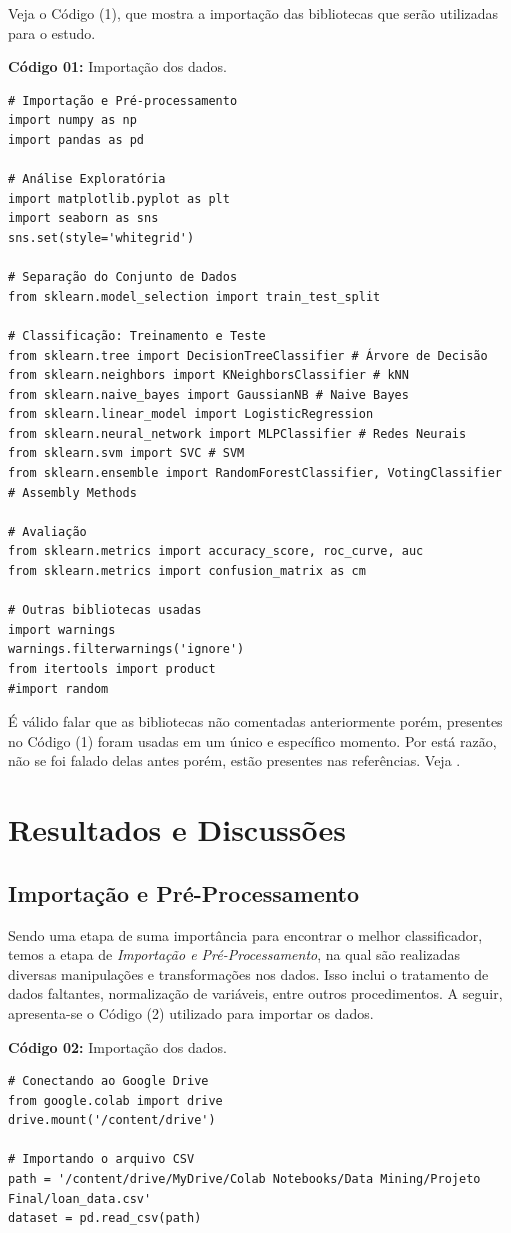 \documentclass[a4paper,12pt]{article} %
\begin{document}
Veja o Código (1), que mostra a importação das bibliotecas que serão utilizadas para o estudo.
\begin{center}
\textbf{Código 01:} Importação dos dados. 
\begin{verbatim}
# Importação e Pré-processamento
import numpy as np
import pandas as pd

# Análise Exploratória
import matplotlib.pyplot as plt
import seaborn as sns
sns.set(style='whitegrid')

# Separação do Conjunto de Dados
from sklearn.model_selection import train_test_split

# Classificação: Treinamento e Teste
from sklearn.tree import DecisionTreeClassifier # Árvore de Decisão
from sklearn.neighbors import KNeighborsClassifier # kNN
from sklearn.naive_bayes import GaussianNB # Naive Bayes
from sklearn.linear_model import LogisticRegression
from sklearn.neural_network import MLPClassifier # Redes Neurais
from sklearn.svm import SVC # SVM
from sklearn.ensemble import RandomForestClassifier, VotingClassifier # Assembly Methods

# Avaliação
from sklearn.metrics import accuracy_score, roc_curve, auc
from sklearn.metrics import confusion_matrix as cm

# Outras bibliotecas usadas
import warnings
warnings.filterwarnings('ignore')
from itertools import product
#import random
\end{verbatim}
\end{center}

É válido falar que as bibliotecas não comentadas anteriormente porém, presentes no Código (1) foram usadas em um único e específico momento. Por está  razão, não se foi falado delas antes porém, estão presentes nas referências. Veja \cite{python-warnings, python-itertools, python-random}.

\section{Resultados e Discussões}
\subsection{Importação e Pré-Processamento}
Sendo uma etapa de suma importância para encontrar o melhor classificador, temos a etapa de \textit{Importação e Pré-Processamento}, na qual são realizadas diversas manipulações e transformações nos dados. Isso inclui o tratamento de dados faltantes, normalização de variáveis, entre outros procedimentos. A seguir, apresenta-se o Código (2) utilizado para importar os dados.
\begin{center}
\textbf{Código 02:} Importação dos dados. 
\begin{verbatim}
# Conectando ao Google Drive
from google.colab import drive
drive.mount('/content/drive')

# Importando o arquivo CSV
path = '/content/drive/MyDrive/Colab Notebooks/Data Mining/Projeto Final/loan_data.csv'
dataset = pd.read_csv(path)
\end{verbatim}
\end{center}
\end{document}
